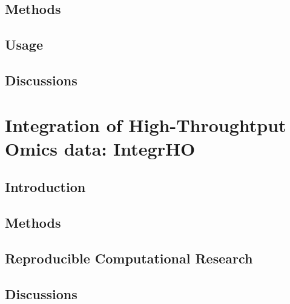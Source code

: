\documentclass[b5paper, oneside, british, intoc, bibliograph=totoc, index=totoc, BCOR10mm, twoside, openright]{book}
\numberwithin{equation}{section}
\numberwithin{figure}{section}
\begin{document}
\section{Methods}

\section{Usage}

\section{Discussions}



\chapter{Integration of High-Throughtput Omics data: IntegrHO} \label{sec:integrhocap}

\section{Introduction} \label{sec:integrhointro}

\section{Methods}  \label{sec:integrhometh}

\section{Reproducible Computational Research} \label{sec:integrhorr}

\section{Discussions} \label{sec:integrhofuture}

\end{document}
